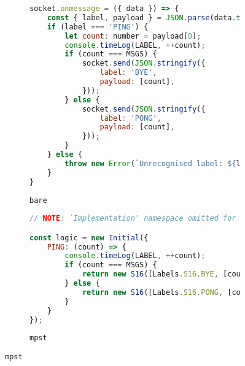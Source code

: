 \begin{figure}[!ht]
\centering
\begin{subfigure}[b]{\textwidth}
\centering
\begin{lstlisting}[language=javascript,tabsize=2]
socket.onmessage = ({ data }) => {
	const { label, payload } = JSON.parse(data.toString());
	if (label === 'PING') {
		let count: number = payload[0];
		console.timeLog(LABEL, ++count);
		if (count === MSGS) {
			socket.send(JSON.stringify({
				label: 'BYE',
				payload: [count],
			}));
		} else {
			socket.send(JSON.stringify({
				label: 'PONG',
				payload: [count],
			}));
		}
	} else {
		throw new Error(`Unrecognised label: ${label}`)
	}
}
\end{lstlisting}
\caption{\texttt{bare}}
\label{lst:nodepingpongbare}
\end{subfigure}
\hfill
\begin{subfigure}[b]{\textwidth}
\centering
\begin{lstlisting}[language=javascript,tabsize=2]
// NOTE: `Implementation' namespace omitted for brevity.

const logic = new Initial({
	PING: (count) => {
		console.timeLog(LABEL, ++count);
		if (count === MSGS) {
			return new S16([Labels.S16.BYE, [count], new Terminal()]);
		} else {
			return new S16([Labels.S16.PONG, [count], logic]);
		}
 	}
});
\end{lstlisting}
\caption{\texttt{mpst}}
\label{lst:nodepingpongmpst}
\end{subfigure}
\label{fig:nodepingpong}
\end{figure}